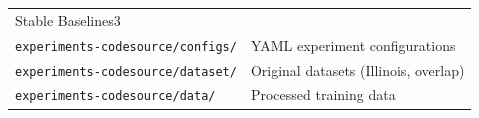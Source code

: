 \begin{longtable}[]{@{}
	>{\raggedright\arraybackslash}p{}
	>{\raggedright\arraybackslash}p{}@{}}
	Stable Baselines3                                                                     \\
	\texttt{experiments-codesource/configs/}               & YAML experiment
	configurations                                                                        \\
	\texttt{experiments-codesource/dataset/}               & Original datasets (Illinois,
	overlap)                                                                              \\
	\texttt{experiments-codesource/data/}                  & Processed training data      \\
\end{longtable}


